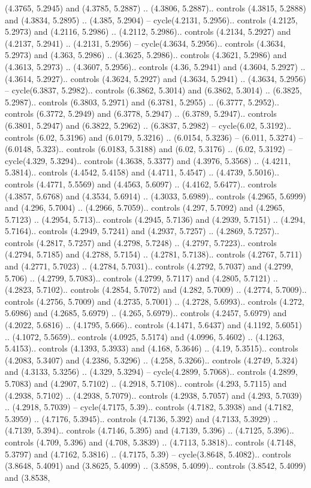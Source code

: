 (4.3765, 5.2945) and (4.3785, 5.2887) .. (4.3806, 5.2887).. controls (4.3815, 5.2888) and (4.3834, 5.2895) .. (4.385, 5.2904) -- cycle(4.2131, 5.2956).. controls (4.2125, 5.2973) and (4.2116, 5.2986) .. (4.2112, 5.2986).. controls (4.2134, 5.2927) and (4.2137, 5.2941) .. (4.2131, 5.2956) -- cycle(4.3634, 5.2956).. controls (4.3634, 5.2973) and (4.363, 5.2986) .. (4.3625, 5.2986).. controls (4.3621, 5.2986) and (4.3613, 5.2973) .. (4.3607, 5.2956).. controls (4.36, 5.2941) and (4.3604, 5.2927) .. (4.3614, 5.2927).. controls (4.3624, 5.2927) and (4.3634, 5.2941) .. (4.3634, 5.2956) -- cycle(6.3837, 5.2982).. controls (6.3862, 5.3014) and (6.3862, 5.3014) .. (6.3825, 5.2987).. controls (6.3803, 5.2971) and (6.3781, 5.2955) .. (6.3777, 5.2952).. controls (6.3772, 5.2949) and (6.3778, 5.2947) .. (6.3789, 5.2947).. controls (6.3801, 5.2947) and (6.3822, 5.2962) .. (6.3837, 5.2982) -- cycle(6.02, 5.3192).. controls (6.02, 5.3196) and (6.0179, 5.3216) .. (6.0154, 5.3236) -- (6.011, 5.3274) -- (6.0148, 5.323).. controls (6.0183, 5.3188) and (6.02, 5.3176) .. (6.02, 5.3192) -- cycle(4.329, 5.3294).. controls (4.3638, 5.3377) and (4.3976, 5.3568) .. (4.4211, 5.3814).. controls (4.4542, 5.4158) and (4.4711, 5.4547) .. (4.4739, 5.5016).. controls (4.4771, 5.5569) and (4.4563, 5.6097) .. (4.4162, 5.6477).. controls (4.3857, 5.6768) and (4.3534, 5.6914) .. (4.3033, 5.6989).. controls (4.2965, 5.6999) and (4.296, 5.7004) .. (4.2966, 5.7059).. controls (4.297, 5.7092) and (4.2965, 5.7123) .. (4.2954, 5.713).. controls (4.2945, 5.7136) and (4.2939, 5.7151) .. (4.294, 5.7164).. controls (4.2949, 5.7241) and (4.2937, 5.7257) .. (4.2869, 5.7257).. controls (4.2817, 5.7257) and (4.2798, 5.7248) .. (4.2797, 5.7223).. controls (4.2794, 5.7185) and (4.2788, 5.7154) .. (4.2781, 5.7138).. controls (4.2767, 5.711) and (4.2771, 5.7023) .. (4.2784, 5.7031).. controls (4.2792, 5.7037) and (4.2799, 5.706) .. (4.2799, 5.7083).. controls (4.2799, 5.7117) and (4.2805, 5.7121) .. (4.2823, 5.7102).. controls (4.2854, 5.7072) and (4.282, 5.7009) .. (4.2774, 5.7009).. controls (4.2756, 5.7009) and (4.2735, 5.7001) .. (4.2728, 5.6993).. controls (4.272, 5.6986) and (4.2685, 5.6979) .. (4.265, 5.6979).. controls (4.2457, 5.6979) and (4.2022, 5.6816) .. (4.1795, 5.666).. controls (4.1471, 5.6437) and (4.1192, 5.6051) .. (4.1072, 5.5659).. controls (4.0925, 5.5174) and (4.0996, 5.4602) .. (4.1263, 5.4153).. controls (4.1393, 5.3933) and (4.168, 5.3646) .. (4.19, 5.3515).. controls (4.2083, 5.3407) and (4.2386, 5.3296) .. (4.258, 5.3266).. controls (4.2749, 5.324) and (4.3133, 5.3256) .. (4.329, 5.3294) -- cycle(4.2899, 5.7068).. controls (4.2899, 5.7083) and (4.2907, 5.7102) .. (4.2918, 5.7108).. controls (4.293, 5.7115) and (4.2938, 5.7102) .. (4.2938, 5.7079).. controls (4.2938, 5.7057) and (4.293, 5.7039) .. (4.2918, 5.7039) -- cycle(4.7175, 5.39).. controls (4.7182, 5.3938) and (4.7182, 5.3959) .. (4.7176, 5.3945).. controls (4.7136, 5.392) and (4.7133, 5.3929) .. (4.7139, 5.394).. controls (4.7146, 5.395) and (4.7139, 5.396) .. (4.7125, 5.396).. controls (4.709, 5.396) and (4.708, 5.3839) .. (4.7113, 5.3818).. controls (4.7148, 5.3797) and (4.7162, 5.3816) .. (4.7175, 5.39) -- cycle(3.8648, 5.4082).. controls (3.8648, 5.4091) and (3.8625, 5.4099) .. (3.8598, 5.4099).. controls (3.8542, 5.4099) and (3.8538, 